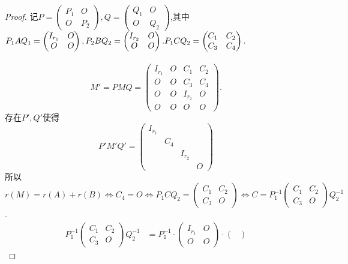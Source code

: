 \documentclass[11pt]{ctexart}
\theoremstyle{definition}
\numberwithin{equation}{section}
\begin{document}
\begin{proof}
    记$P=\begin{pmatrix}
        P_1&O\\O&P_2
    \end{pmatrix},Q=\begin{pmatrix}
        Q_1&O\\O&Q_2
    \end{pmatrix}$,其中$P_1AQ_1=\begin{pmatrix}
        I_{r_1}&O\\O&O
    \end{pmatrix},P_2BQ_2=\begin{pmatrix}
        I_{r_2}&O\\O&O
    \end{pmatrix}.\\P_1CQ_2=\begin{pmatrix}
        C_1&C_2\\C_3&C_4
    \end{pmatrix}.$\\\
    $$M'=PMQ=\begin{pmatrix}
        I_{r_1}&O&C_1&C_2\\O&O&C_3&C_4\\O&O&I_{r_2}&O\\O&O&O&O
    \end{pmatrix}.$$
    存在$P',Q'$使得$$P'M'Q'=\begin{pmatrix}
        I_{r_1}&&&\\ &C_4&&\\ && I_{r_2}&\\ &&&O
    \end{pmatrix}$$
    所以$r(M)=r(A)+r(B)\Leftrightarrow C_4=O\Leftrightarrow P_1CQ_2=\begin{pmatrix}
        C_1&C_2\\C_3&O
    \end{pmatrix}\Leftrightarrow C=P_1^{-1}\begin{pmatrix}
        C_1&C_2\\C_3&O
    \end{pmatrix}Q^{-1}_2$.
    \begin{align*}
        P_1^{-1}\begin{pmatrix}
            C_1&C_2\\C_3&O
        \end{pmatrix}Q^{-1}_2&=P_1^{-1}\cdot \begin{pmatrix}
        I_{r_1}&O\\O&O
        \end{pmatrix} \cdot \begin{pmatrix}

\end{pmatrix}
\end{align*}
\end{proof}
\end{document}
